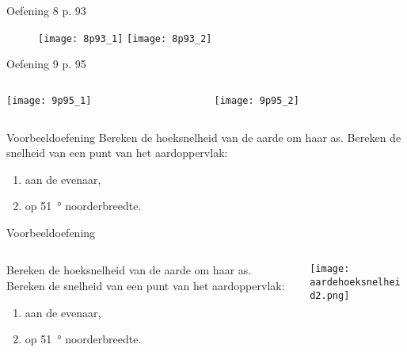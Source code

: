 \begin{frame}{Oefening 8 p. 93}
\begin{figure}
\texttt{[image: 8p93\_1]}%
\texttt{[image: 8p93\_2]}
\end{figure}
\end{frame}


\begin{frame}{Oefening 9 p. 95}
\begin{columns}[T]
    \begin{column}{0.5\textwidth}
    	\texttt{[image: 9p95\_1]}
    \end{column}
    \begin{column}{0.5\textwidth}
    	\texttt{[image: 9p95\_2]}
    \end{column}
\end{columns}
\end{frame}


\begin{frame}{Voorbeeldoefening}
Bereken de hoeksnelheid van de aarde om haar as. Bereken de snelheid van een punt van het aardoppervlak:
\begin{enumerate}
\item aan de evenaar,
\item op \SI{51}{\degree} noorderbreedte.
\end{enumerate}
\end{frame}

\begin{frame}{Voorbeeldoefening}
\begin{columns}[T]
    \begin{column}{0.5\textwidth}
    	Bereken de hoeksnelheid van de aarde om haar as. Bereken de snelheid van een punt van het aardoppervlak:
		\begin{enumerate}
			\item aan de evenaar,
			\item op \SI{51}{\degree} noorderbreedte.
		\end{enumerate}
    \end{column}
    \begin{column}{0.5\textwidth}
    	\texttt{[image: aardehoeksnelheid2.png]}
    \end{column}
\end{columns}
\end{frame}


